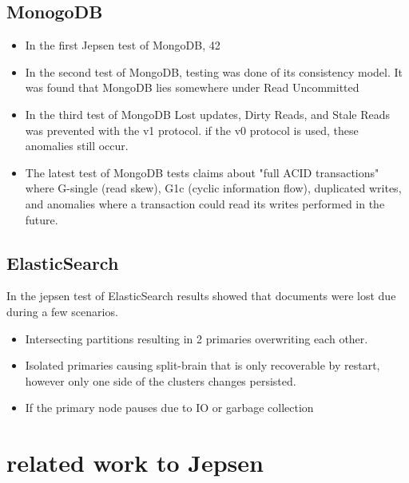 \documentclass[a4paper,10pt,titlepage]{report}
\begin{document}
\subsection{MonogoDB}

\begin{itemize}
\item In the first Jepsen test of MongoDB, 42%
\item In the second test of MongoDB, testing was done of its consistency model. It was found that MongoDB lies somewhere under Read Uncommitted\cite{jepsenmongodb267}
\item In the third test of MongoDB Lost updates, Dirty Reads, and Stale Reads was prevented with the v1 protocol. if the v0 protocol is used, these anomalies still occur.\cite{jepsenmongodb340}
\item The latest test of MongoDB tests claims about "full ACID transactions" where G-single (read skew), G1c (cyclic information flow), duplicated writes, and anomalies where a transaction could read its writes performed in the future. \cite{jepsenmongodb340}
\end{itemize}

\subsection{ElasticSearch}
In the jepsen test of ElasticSearch results showed that documents were lost due during a few scenarios.\cite{aphyrelasticsearch}
\begin{itemize}
    \item Intersecting partitions resulting in 2 primaries overwriting each other.
    \item Isolated primaries causing split-brain that is only recoverable by restart, however only one side of the clusters changes persisted.
    \item If the primary node pauses due to IO or garbage collection
\end{itemize}


\section{related work to Jepsen}


\end{document}
